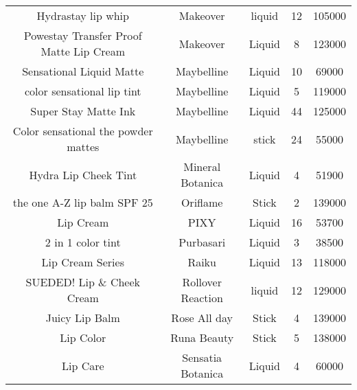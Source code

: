 \begin{table}[htbp]
\begin{tabular}{ccccc}
        Hydrastay lip whip                  & Makeover          & liquid                       & 12              & 105000         \\
        Powestay Transfer Proof Matte Lip
        Cream                               & Makeover          & Liquid                       & 8               & 123000         \\
        Sensational Liquid Matte            & Maybelline        & Liquid                       & 10              & 69000          \\
        color sensational lip tint          & Maybelline        & Liquid                       & 5               & 119000         \\
        Super Stay Matte Ink                & Maybelline        & Liquid                       & 44              & 125000         \\
        Color sensational the powder
        mattes                              & Maybelline        & stick                        & 24              & 55000          \\
        Hydra Lip Cheek Tint                & Mineral Botanica  & Liquid                       & 4               & 51900          \\
        the one A-Z lip balm SPF 25         & Oriflame          & Stick                        & 2               & 139000         \\
        Lip Cream                           & PIXY              & Liquid                       & 16              & 53700          \\
        2 in 1 color tint                   & Purbasari         & Liquid                       & 3               & 38500          \\
        Lip Cream Series                    & Raiku             & Liquid                       & 13              & 118000         \\
        SUEDED! Lip \& Cheek Cream          & Rollover
        Reaction                            & liquid            & 12                           & 129000                           \\
        Juicy Lip Balm                      & Rose All day      & Stick                        & 4               & 139000         \\
        Lip Color                           & Runa Beauty       & Stick                        & 5               & 138000         \\
        Lip Care                            & Sensatia Botanica & Liquid                       & 4               & 60000          \\

\end{tabular}
\end{table}
